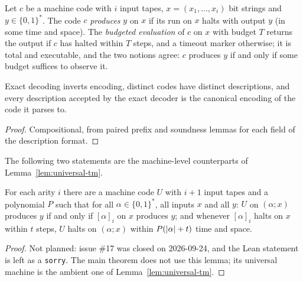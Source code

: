 \begin{definition}
\label{def:code-run}
\leanok
Let $c$ be a machine code with $i$ input tapes, $x = (x_1, \ldots, x_i)$ bit strings and $y \in
\{0,1\}^*$. The code $c$ \emph{produces} $y$ on $x$ if its run on $x$ halts with output
$y$ (in some time and space). The \emph{budgeted evaluation} of $c$ on $x$ with budget
$T$ returns the output if $c$ has halted within $T$ steps, and a timeout marker
otherwise; it is total and executable, and the two notions agree: $c$ produces $y$ if
and only if some budget suffices to observe it.
\end{definition}

\begin{lemma}
\label{lem:code-canonical}
\leanok
Exact decoding inverts encoding, distinct codes have distinct descriptions, and every
description accepted by the exact decoder is the canonical encoding of the code it
parses to.
\end{lemma}
\begin{proof}
\leanok
Compositional, from paired prefix and soundness lemmas for each field of the
description format.
\end{proof}

The following two statements are the machine-level counterparts of
Lemma~\ref{lem:universal-tm}. 

\begin{lemma}
\label{lem:universal-machine}
\leanok
For each arity $i$ there are a machine code $U$ with $i + 1$ input tapes and a
polynomial $P$ such that for all $\alpha \in \{0,1\}^*$, all inputs $x$ and all $y$:
$U$ on $(\alpha; x)$ produces $y$ if and only if $[\alpha]_i$ on $x$ produces $y$; and
whenever $[\alpha]_i$ halts on $x$ within $t$ steps, $U$ halts on $(\alpha; x)$ within
$P(\left\vert {\alpha} \right\vert + t)$ time and space.
\end{lemma}

\begin{proof}
Not planned: issue \#17 was closed on 2026-09-24, and the Lean statement is left as a
\texttt{sorry}. The main theorem does not use this lemma; its universal machine is the ambient
one of Lemma~\ref{lem:universal-tm}.
\end{proof}

